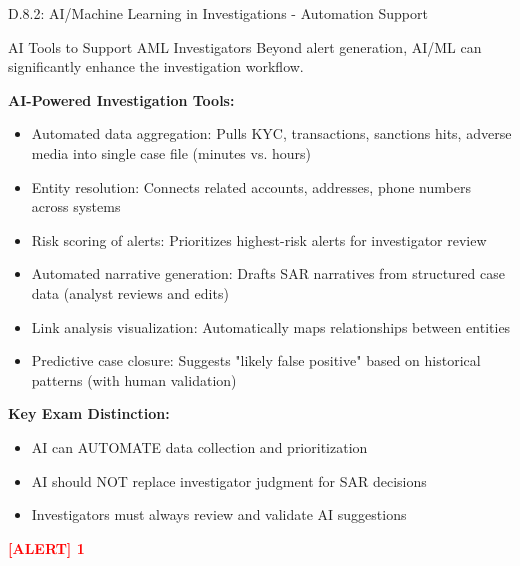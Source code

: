 \documentclass[11pt,a4paper]{beamer}
\newcommand{\redflag}[1]{\textcolor{red}{\textbf{[ALERT] 1}}}
\begin{document}
\begin{frame}{D.8.2: AI/Machine Learning in Investigations - Automation Support}
	\begin{block}{AI Tools to Support AML Investigators}
		Beyond alert generation, AI/ML can significantly enhance the investigation workflow.
	\end{block}
	\textbf{AI-Powered Investigation Tools:}
	\begin{itemize}
		\item Automated data aggregation: Pulls KYC, transactions, sanctions hits, adverse media into single case file (minutes vs. hours)
		\item Entity resolution: Connects related accounts, addresses, phone numbers across systems
		\item Risk scoring of alerts: Prioritizes highest-risk alerts for investigator review
		\item Automated narrative generation: Drafts SAR narratives from structured case data (analyst reviews and edits)
		\item Link analysis visualization: Automatically maps relationships between entities
		\item Predictive case closure: Suggests "likely false positive" based on historical patterns (with human validation)
	\end{itemize}
	\textbf{Key Exam Distinction:}
	\begin{itemize}
		\item AI can AUTOMATE data collection and prioritization
		\item AI should NOT replace investigator judgment for SAR decisions
		\item Investigators must always review and validate AI suggestions
	\end{itemize}
	\redflag{A SAR filed solely on an AI recommendation without human analysis is a regulatory risk.}
\end{frame}
\end{document}
